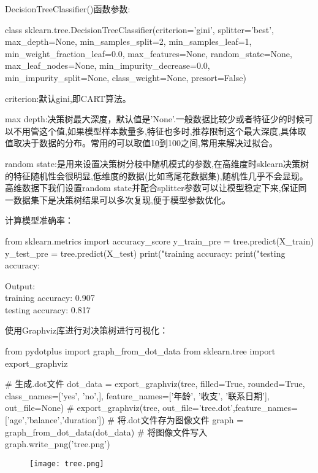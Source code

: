 \documentclass[12pt]{article}
\begin{document}
DecisionTreeClassifier()函数参数:

\begin{python}
class sklearn.tree.DecisionTreeClassifier(criterion=’gini’, splitter=’best’, max_depth=None, min_samples_split=2, min_samples_leaf=1, min_weight_fraction_leaf=0.0, max_features=None, random_state=None, max_leaf_nodes=None, min_impurity_decrease=0.0, min_impurity_split=None, class_weight=None, presort=False)
\end{python}

criterion:默认gini,即CART算法。

max depth:决策树最大深度，默认值是'None'.一般数据比较少或者特征少的时候可以不用管这个值,如果模型样本数量多,特征也多时,推荐限制这个最大深度,具体取值取决于数据的分布。常用的可以取值10到100之间,常用来解决过拟合。

random state:是用来设置决策树分枝中随机模式的参数,在高维度时sklearn决策树的特征随机性会很明显,低维度的数据(比如鸢尾花数据集),随机性几乎不会显现。高维数据下我们设置random state并配合splitter参数可以让模型稳定下来,保证同一数据集下是决策树结果可以多次复现,便于模型参数优化。


计算模型准确率：

\begin{python}
from sklearn.metrics import accuracy_score
y_train_pre = tree.predict(X_train)
y_test_pre = tree.predict(X_test)
print("training accuracy: %
print("testing accuracy: %
\end{python}
Output:\\
training accuracy: 0.907\\
testing accuracy: 0.817

使用Graphviz库进行对决策树进行可视化：

\begin{python}
from pydotplus import graph_from_dot_data
from sklearn.tree import export_graphviz

# 生成.dot文件
dot_data = export_graphviz(tree,
                           filled=True, 
                           rounded=True,
                           class_names=['yes', 
                                        'no',],
                           feature_names=['年龄', 
                                          '收支',
                                          '联系日期'],
                           out_file=None) 
# export_graphviz(tree, out_file='tree.dot',feature_names=['age','balance','duration'])
# 将.dot文件存为图像文件
graph = graph_from_dot_data(dot_data) 
# 将图像文件写入
graph.write_png('tree.png')
\end{python}

\begin{figure}[htbp]
	\centering
	\texttt{[image: tree.png]}
\end{figure}






\end{document}
